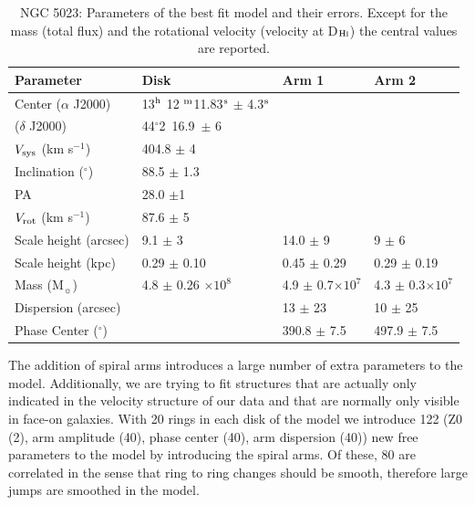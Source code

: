 \documentclass[useAMS,usenatbib]{mn2e}
\newcommand{\msun}{M$_{\sun}$}
\begin{document}
 \begin{table}
    \centering
    \begin{tabular}{@{} llll @{}} %
       \hline
       \hline
Parameter & Disk   & Arm 1 & Arm 2  \\
       \hline
Center ($\alpha$ J2000)&13$^{{\rm h}}$  12 $^{{\rm m}}$11.83$^{{\rm s}}$ $\pm$ 4.3$^{{\rm s}} $&& \\
	 \hspace*{0.93cm}($\delta$ J2000)&44$^{\circ}$2\arcmin\ 16.9\arcsec\ $\pm$ 6 \arcsec& &\\	
$V_{\rm sys}$ (km s$^{-1}$)&404.8 $\pm $ 4& &\\
Inclination ($^{\circ}$)&88.5 $\pm$ 1.3& & \\
PA &28.0 $\pm $1& &  \\
$V_{\rm rot}$ (km s$^{-1}$)&87.6 $\pm $ 5& & \\
Scale height (arcsec)&9.1 $\pm$ 3&14.0 $\pm$ 9&9 $\pm$ 6\\
Scale height (kpc)&0.29 $\pm$ 0.10 &0.45 $\pm$ 0.29&0.29 $\pm$ 0.19\\
Mass (\msun)&4.8 $\pm$ 0.26 $\times 10^8$&4.9 $\pm$ 0.7$\times10^7$&4.3 $\pm$ 0.3$\times10^7$ \\
Dispersion (arcsec) & &13 $\pm$ 23&10 $\pm$ 25\\
Phase Center ($^{\circ}$) & &390.8 $\pm$ 7.5& 497.9 $\pm$ 7.5\\
\hline
    \end{tabular}
    \caption{NGC 5023: Parameters of the best fit model and their errors. Except for the mass (total flux) and the rotational velocity (velocity at D$_{\rm{H \textsc{i}}}$) the central values are reported. }
    \label{tabX}
 \end{table}
\indent The addition of spiral arms introduces a large number of extra parameters to the model. Additionally, we are trying to fit structures that are actually only indicated in the velocity structure of our data and that are normally only visible in face-on galaxies. With 20 rings in each disk of the model  we introduce 122 (Z0 (2), arm amplitude (40), phase center (40), arm dispersion (40))  new free parameters to the model by introducing the spiral arms. Of these, 80 are correlated in the sense that  ring to ring changes should be smooth, therefore large jumps are smoothed in the model.\\
\end{document}
